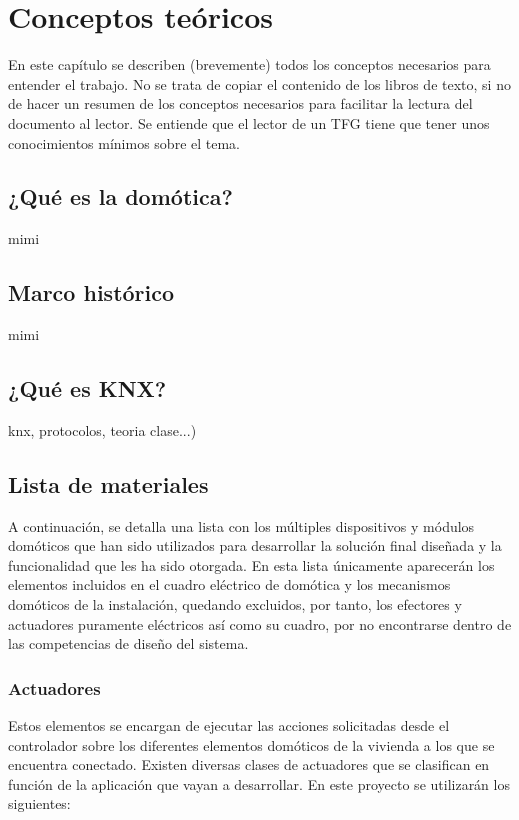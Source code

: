 \chapter{Conceptos teóricos}

En este capítulo se describen (brevemente) todos los conceptos necesarios para entender el trabajo. No se trata de copiar el contenido de los libros de texto, si no de hacer un resumen de los conceptos necesarios para facilitar la lectura del documento al lector. Se entiende que el lector de un TFG tiene que tener unos conocimientos mínimos sobre el tema.

\section{¿Qué es la domótica?}

mimi

\section{Marco histórico}

mimi

\section{¿Qué es KNX?}

knx, protocolos, teoria clase...)

\section{Lista de materiales}

A continuación, se detalla una lista con los múltiples dispositivos y módulos domóticos que han sido utilizados para desarrollar la solución final diseñada y la funcionalidad que les ha sido otorgada. En esta lista únicamente aparecerán los elementos incluidos en el cuadro eléctrico de domótica y los mecanismos domóticos de la instalación, quedando excluidos, por tanto, los efectores y actuadores puramente eléctricos así como su cuadro, por no encontrarse dentro de las competencias de diseño del sistema.

\subsection{Actuadores} Estos elementos se encargan de ejecutar las acciones solicitadas desde el controlador sobre los diferentes elementos domóticos de la vivienda a los que se encuentra conectado. Existen diversas clases de actuadores que se clasifican en función de la aplicación que vayan a desarrollar. En este proyecto se utilizarán los siguientes:


